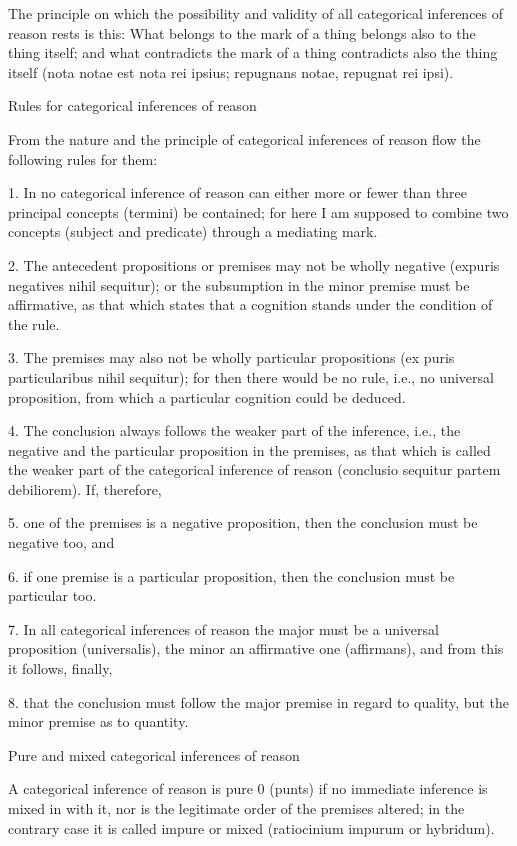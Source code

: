 The principle on which the possibility and validity of
all categorical inferences of reason rests is this:
What belongs to the mark of a thing
belongs also to the thing itself;
and what contradicts the mark of a thing
contradicts also the thing itself
(nota notae est nota rei ipsius;
repugnans notae, repugnat rei ipsi).

Rules for categorical inferences of reason

From the nature and the principle of categorical inferences of reason flow
the following rules for them:

1.  In no categorical inference of reason can
    either more or fewer than three
    principal concepts (termini) be contained;
    for here I am supposed to combine
    two concepts (subject and predicate)
    through a mediating mark.

2.  The antecedent propositions or premises
    may not be wholly negative
    (expuris negatives nihil sequitur);
    or the subsumption in the minor premise must be affirmative,
    as that which states that a cognition
    stands under the condition of the rule.

3.  The premises may also not be wholly particular propositions
    (ex puris particularibus nihil sequitur);
    for then there would be no rule, i.e., no universal proposition,
    from which a particular cognition could be deduced.

4.  The conclusion always follows the weaker part of the inference, i.e.,
    the negative and the particular proposition in the premises,
    as that which is called the weaker part of
    the categorical inference of reason
    (conclusio sequitur partem debiliorem).
    If, therefore,

5.  one of the premises is a negative proposition,
    then the conclusion must be negative too, and

6.  if one premise is a particular proposition,
    then the conclusion must be particular too.

7.  In all categorical inferences of reason
    the major must be a universal proposition (universalis),
    the minor an affirmative one (affirmans),
    and from this it follows, finally,

8.  that the conclusion must follow the major premise in regard to quality,
    but the minor premise as to quantity.

Pure and mixed categorical inferences of reason

A categorical inference of reason is pure 0 (punts) if no immediate inference
is mixed in with it, nor is the legitimate order of the premises altered; in
the contrary case it is called impure or mixed (ratiocinium impurum or
hybridum).

